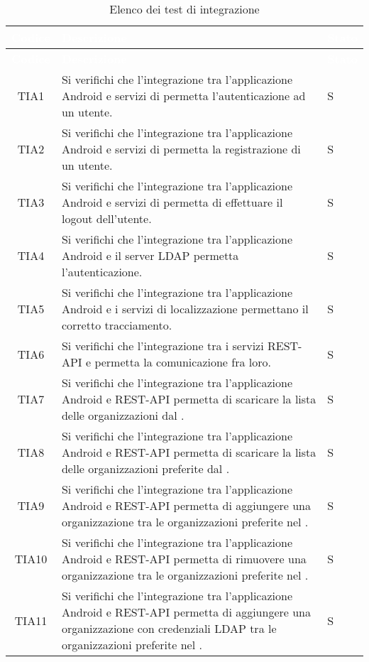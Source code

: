 {
\renewcommand{\arraystretch}{1.5}
\centering
\begin{longtable}{ c C{13cm} C{1cm}}
\caption{Elenco dei test di integrazione}\\
\textcolor{white}{\textbf{Codice}} & \textcolor{white}{\textbf{Descrizione}} & \textcolor{white}{\textbf{Stato}}\\
\endfirsthead
{}
\textcolor{white}{\textbf{Codice}} & \textcolor{white}{\textbf{Descrizione}} & \textcolor{white}{\textbf{Stato}}\\
\endhead

TIA1 & Si verifichi che l’integrazione tra l’applicazione Android e servizi di  permetta l’autenticazione ad un utente. & S \\
TIA2 & Si verifichi che l’integrazione tra l’applicazione Android e servizi di  permetta la registrazione di un utente. & S \\
TIA3 & Si verifichi che l’integrazione tra l’applicazione Android e servizi di  permetta di effettuare il logout dell'utente. & S \\
TIA4 & Si verifichi che l’integrazione tra l’applicazione Android e il server LDAP permetta l’autenticazione. & S \\
TIA5 & Si verifichi che l’integrazione tra l’applicazione Android e i servizi di localizzazione permettano il corretto tracciamento. & S \\
TIA6 & Si verifichi che l’integrazione tra i servizi REST-API e  permetta la comunicazione fra loro. & S \\
TIA7 & Si verifichi che l’integrazione tra l’applicazione Android e REST-API permetta di scaricare la lista delle organizzazioni dal . & S \\
TIA8 & Si verifichi che l’integrazione tra l’applicazione Android e REST-API permetta di scaricare la lista delle organizzazioni preferite dal . & S \\
TIA9 & Si verifichi che l’integrazione tra l’applicazione Android e REST-API permetta di aggiungere una organizzazione tra le organizzazioni preferite nel . & S \\
TIA10 & Si verifichi che l’integrazione tra l’applicazione Android e REST-API permetta di rimuovere una organizzazione tra le organizzazioni preferite nel . & S \\
TIA11 & Si verifichi che l’integrazione tra l’applicazione Android e REST-API permetta di aggiungere una organizzazione con credenziali LDAP tra le organizzazioni preferite nel . & S \\

\end{longtable}}
